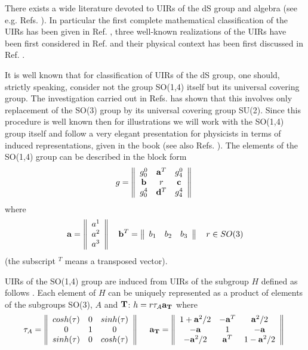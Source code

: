 \documentclass[a4paper,12pt]{article}%
\begin{document}
There exists a wide literature devoted to 
UIRs of the dS group and algebra
(see e.g. Refs. \cite{Dix1,Tak,Hann,Str,Schwarz,
Men,Moy,Dobrev,Mielke,Klimyk,lev1,lev1a}).
In particular the first complete mathematical classification of the
UIRs has been given in Ref. \cite{Dix1}, three well-known
realizations of the UIRs have been first considered in Ref. \cite{Tak}
and their physical context has been first discussed in Ref. \cite{Hann}.

It is well known that for classification of UIRs of the dS group,
one should, strictly speaking, consider not the group SO(1,4) 
itself but its
universal covering group. The investigation carried out in
Refs. \cite{Dix1,Tak,Hann,Str,Moy} has shown that this 
involves only replacement of the SO(3) group by its universal 
covering group SU(2). Since this procedure is well known then
for illustrations we will work with the SO(1,4) group itself and 
follow a very elegant presentation for physicists in terms
of induced representations, given in the book \cite{Men}
(see also Refs. \cite{Dobrev,Barut,Str}). 
The elements of the SO(1,4) group can be described in the
block form
\begin{equation}
g=\left\|\begin{array}{ccc}
g_0^0&{\bf a}^T&g_4^0\\
{\bf b}&r&{\bf c}\\
g_0^4&{\bf d}^T&g_4^4
\end{array}\right\|\ 
\label{3}
\end{equation}
where 
\begin{equation}
\label{4}
{\bf a}=\left\|\begin{array}{c}a^1\\a^2\\a^3\end{array}\right\| \quad
{\bf b}^T=\left\|\begin{array}{ccc}b_1&b_2&b_3\end{array}\right\|
\quad r\in SO(3)
\end{equation}
(the subscript $^T$ means a transposed vector).

UIRs of the SO(1,4) 
group are induced from UIRs of the subgroup $H$ defined
as follows \cite{Str,Men,Dobrev}. Each element of $H$ can be uniquely
represented as a product of elements of the subgroups
SO(3), $A$ and ${\bf T}$: $h=r\tau_A{\bf a}_{\bf T}$ where 
\begin{equation}
\tau_A=\left\|\begin{array}{ccc}
cosh(\tau)&0&sinh(\tau)\\
0&1&0\\
sinh(\tau)&0&cosh(\tau)
\end{array}\right\|\ \quad
{\bf a}_{\bf T}=\left\|\begin{array}{ccc}
1+{\bf a}^2/2&-{\bf a}^T&{\bf a}^2/2\\
-{\bf a}&1&-{\bf a}\\
-{\bf a}^2/2&{\bf a}^T&1-{\bf a}^2/2
\end{array}\right\|\ 
\label{5}
\end{equation}
\end{document}
